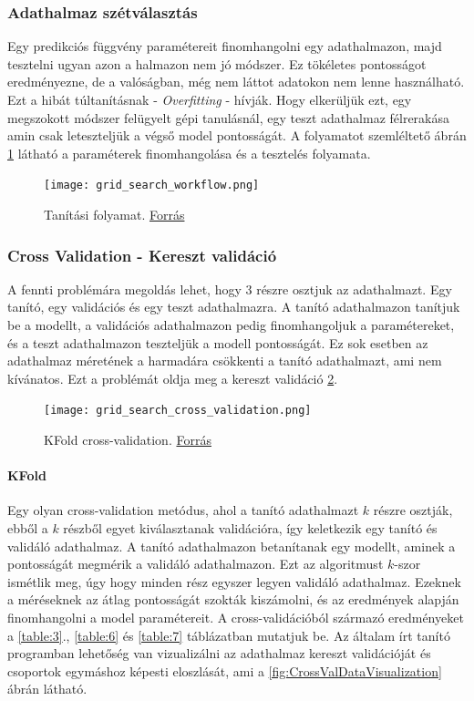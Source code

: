 \documentclass[12pt,a4paper]{article}
\begin{document}
\subsubsection{Adathalmaz szétválasztás}
Egy predikciós függvény paramétereit finomhangolni egy adathalmazon, majd tesztelni ugyan azon a halmazon nem jó módszer.
Ez tökéletes pontosságot eredményezne, de a valóságban, még nem láttot adatokon nem lenne használható. Ezt a hibát túltanításnak - \textit{Overfitting} - hívják.
Hogy elkerüljük ezt, egy megszokott módszer felügyelt gépi tanulásnál, egy teszt adathalmaz félrerakása amin csak leteszteljük a végső model pontosságát.
A folyamatot szemléltető ábrán \ref{fig:TrainTestSplit} látható a paraméterek finomhangolása és a tesztelés folyamata.

\begin{figure}[H]
    \centering
    \texttt{[image: grid\_search\_workflow.png]}
    \centering
    \caption{Tanítási folyamat. \href{https://scikit-learn.org/stable/_images/grid_search_workflow.png}{Forrás}}
    \label{fig:TrainTestSplit}
\end{figure}

\subsubsection{Cross Validation - Kereszt validáció}
A fennti problémára megoldás lehet, hogy 3 részre osztjuk az adathalmazt. Egy tanító, egy validációs és egy teszt adathalmazra.
A tanító adathalmazon tanítjuk be a modellt, a validációs adathalmazon pedig finomhangoljuk a paramétereket, és a teszt adathalmazon teszteljük a modell pontosságát.
Ez sok esetben az adathalmaz méretének a harmadára csökkenti a tanító adathalmazt, ami nem kívánatos. Ezt a problémát oldja meg a kereszt validáció \ref{fig:KFold}.

\begin{figure}
    \centering
    \texttt{[image: grid\_search\_cross\_validation.png]}
    \caption{KFold cross-validation. \href{https://scikit-learn.org/stable/_images/grid_search_cross_validation.png}{Forrás}}
    \label{fig:KFold}
\end{figure}

\paragraph{KFold} Egy olyan cross-validation metódus, ahol a tanító adathalmazt
$k$ részre osztják, ebből a $k$ részből egyet kiválasztanak validációra, így keletkezik egy tanító és validáló adathalmaz. A tanító adathalmazon betanítanak
egy modellt, aminek a pontosságát megmérik a validáló adathalmazon. Ezt az algoritmust $k$-szor ismétlik meg, úgy hogy minden rész egyszer legyen validáló
adathalmaz. Ezeknek a méréseknek az átlag pontosságát szokták kiszámolni, és az eredmények alapján finomhangolni a model paramétereit. A cross-validációból származó eredményeket a \ref{table:3}., \ref{table:6} és \ref{table:7} táblázatban mutatjuk be.
Az általam írt tanító programban lehetőség van vizualizálni az adathalmaz kereszt validációját és csoportok egymáshoz képesti eloszlását, ami a \ref{fig:CrossValDataVisualization} ábrán látható.
\end{document}
